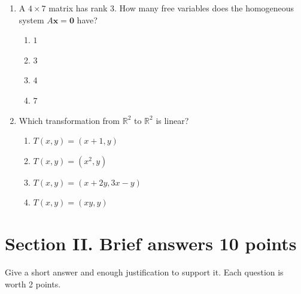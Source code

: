 \documentclass[11pt]{article}
\newif\ifshowsolutions
\newcommand{\R}{\mathbb{R}}
\newcommand{\vect}[1]{\mathbf{#1}}
\newcommand{\solution}[1]{%
  \ifshowsolutions
    \par\medskip
    {\color{solutionblue}\textbf{Solution.} #1}
    \par\medskip
  \fi}
\begin{document}
\begin{enumerate}
\item A $4\times7$ matrix has rank $3$. How many free variables does the homogeneous system $A\vect x=\vect0$ have?
\begin{enumerate}[label=\Alph*.]
  \item $1$
  \item $3$
  \item $4$
  \item $7$
\end{enumerate}
\solution{\textbf{C.} Rank $3$ means there are $3$ pivot columns. Since $A$ has $7$ columns, the remaining $7-3=4$ columns correspond to free variables.}

\item Which transformation from $\R^2$ to $\R^2$ is linear?
\begin{enumerate}[label=\Alph*.]
  \item $T(x,y)=(x+1,y)$
  \item $T(x,y)=(x^2,y)$
  \item $T(x,y)=(x+2y,3x-y)$
  \item $T(x,y)=(xy,y)$
\end{enumerate}
\solution{\textbf{C.} It is multiplication by $\begin{bmatrix}1&2\\3&-1\end{bmatrix}$.}
\end{enumerate}

\newpage
\section*{Section II. Brief answers \hfill 10 points}

Give a short answer and enough justification to support it. Each question is worth 2 points.
\end{document}

